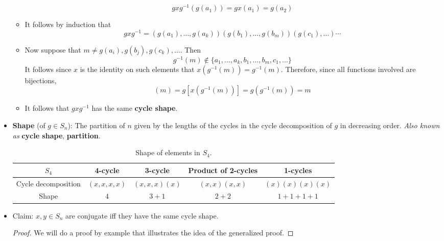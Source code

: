 \documentclass[../notes.tex]{subfiles}
\begin{document}
\begin{itemize}
\begin{itemize}
        \begin{equation*}
            gxg^{-1}(g(a_1)) = gx(a_1)
            = g(a_2)
        \end{equation*}
        \item It follows by induction that
        \begin{equation*}
            gxg^{-1} = (g(a_1),\dots,g(a_k))(g(b_1),\dots,g(b_m))(g(c_1),\dots)\cdots
        \end{equation*}
        \item Now suppose that $m\neq g(a_i),g(b_j),g(c_k),\dots$. Then
        \begin{equation*}
            g^{-1}(m) \notin \{a_1,\dots,a_k,b_1,\dots,b_m,c_1,\dots\}
        \end{equation*}
        It follows since $x$ is the identity on such elements that $x(g^{-1}(m))=g^{-1}(m)$. Therefore, since all functions involved are bijections,
        \begin{equation*}
            [gxg^{-1}](m) = g[x(g^{-1}(m))] = g(g^{-1}(m)) = m
        \end{equation*}
        \item It follows that $gxg^{-1}$ has the same \textbf{cycle shape}.
    \end{itemize}
    \item \textbf{Shape} (of $g\in S_n$): The partition of $n$ given by the lengths of the cycles in the cycle decomposition of $g$ in decreasing order. \emph{Also known as} \textbf{cycle shape}, \textbf{partition}.
    \begin{table}[H]
        \centering
        \small
        \renewcommand{\arraystretch}{1.2}
        \begin{tabular}{c|c|c|c|c}
            $S_4$ & 4-cycle & 3-cycle & Product of 2-cycles & 1-cycles\\
            \hline
            Cycle decomposition & $(x,x,x,x)$ & $(x,x,x)(x)$ & $(x,x)(x,x)$ & $(x)(x)(x)(x)$\\
            Shape & $4$ & $3+1$ & $2+2$ & $1+1+1+1$\\
        \end{tabular}
        \caption{Shape of elements in $S_4$.}
        \label{tab:shapeS4}
    \end{table}
    \item Claim: $x,y\in S_n$ are conjugate iff they have the same cycle shape.
    \begin{proof}
        We will do a proof by example that illustrates the idea of the generalized proof.\par

\end{proof}
\end{itemize}
\end{document}

